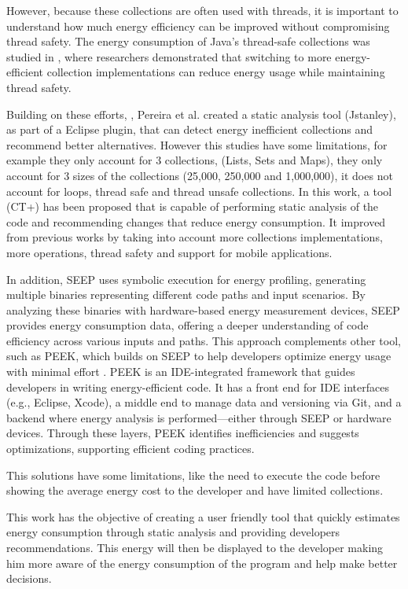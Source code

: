 \documentclass[sigplan]{acmart}
\begin{document}
However, because these collections are often used with threads, it is important to understand how much energy efficiency can be improved without compromising thread safety. The energy consumption of Java's thread-safe collections was studied in \cite{7816451}, where researchers demonstrated that switching to more energy-efficient collection implementations can reduce energy usage while maintaining thread safety.

Building on these efforts, \cite{10.1145/3238147.3240473}, Pereira et al. created a static analysis tool (Jstanley), as part of a Eclipse plugin, that can detect energy inefficient collections and recommend better alternatives. However this studies have some limitations, for example they only account for 3 collections, (Lists, Sets and Maps), they only account for 3 sizes of the collections (25,000, 250,000 and 1,000,000), it does not account for loops, thread safe and thread unsafe collections. 
In this work\cite{8816747}, a tool (CT+) has been proposed that is capable of performing static analysis of the code and recommending changes that reduce energy consumption. It improved from previous works by taking into account more collections implementations, more operations, thread safety and support for mobile applications. 

In addition, SEEP \cite{10.1145/2094091.2094106} uses symbolic execution for energy profiling, generating multiple binaries representing different code paths and input scenarios. By analyzing these binaries with hardware-based energy measurement devices, SEEP provides energy consumption data, offering a deeper understanding of code efficiency across various inputs and paths. This approach complements other tool, such as PEEK, which builds on SEEP to help developers optimize energy usage with minimal effort \cite{187026}. PEEK is an IDE-integrated framework that guides developers in writing energy-efficient code. It has a front end for IDE interfaces (e.g., Eclipse, Xcode), a middle end to manage data and versioning via Git, and a backend where energy analysis is performed—either through SEEP or hardware devices. Through these layers, PEEK identifies inefficiencies and suggests optimizations, supporting efficient coding practices.


This solutions have some limitations, like the need to execute the code before showing the average energy cost to the developer and have limited collections.

This work has the objective of creating a user friendly tool that quickly estimates energy consumption through static analysis and providing developers recommendations. This energy will then be displayed to the developer making him more aware of the energy consumption of the program and help make better decisions.
\end{document}
